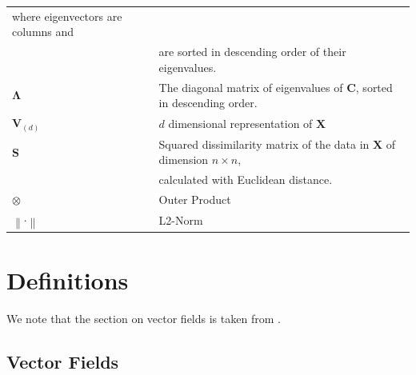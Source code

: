 \documentclass[12pt]{report}
\newcommand\norm[1]{\left\lVert#1\right\rVert}
\begin{document}
\begin{table}[ht]
\begin{tabular}{|l|l|}
where eigenvectors are columns and \\ & are sorted in descending order of their eigenvalues.  \\ \hline
$\mathbf{\Lambda}$    & The diagonal matrix of eigenvalues of $\mathbf{C}$, 
sorted in descending order.        \\ \hline
$\mathbf{V}_{(d)}$ & $d$ dimensional representation of $\mathbf{X}$      \\ \hline
$\mathbf{S}$    & Squared dissimilarity matrix of the data in $\mathbf{X}$ 
of dimension $n \times n$, \\ & calculated with Euclidean distance. \\ \hline
$\otimes$    & Outer Product \\ \hline
$\norm{\cdot}$    & L2-Norm \\ \hline
\end{tabular}
\end{table}

\newpage

\section{Definitions}

We note that the section on vector fields is taken from \cite{ancient}.

\subsection{Vector Fields}
\end{document}

